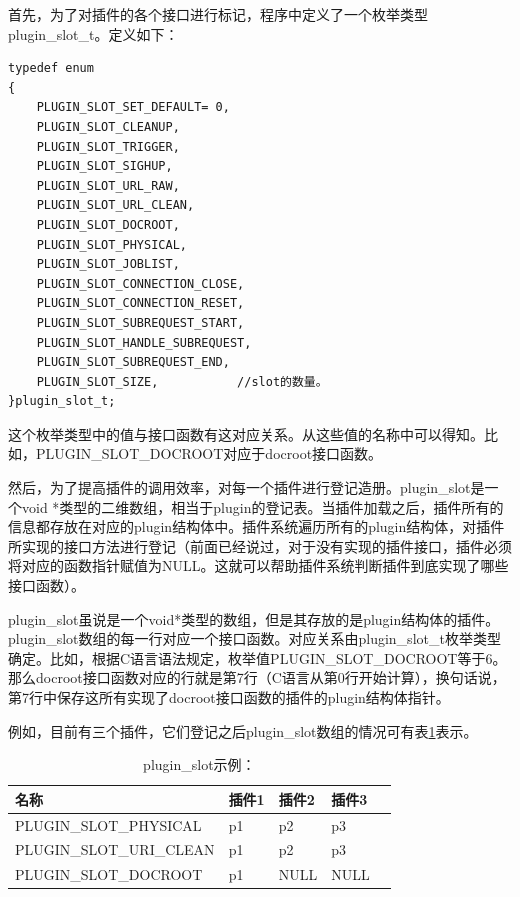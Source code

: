 \documentclass[12pt, twoside, a4paper, xetex]{report}
\begin{document}
	首先，为了对插件的各个接口进行标记，程序中定义了一个枚举类型plugin\_slot\_t。定义如下：
\begin{verbatim}
typedef enum
{
	PLUGIN_SLOT_SET_DEFAULT= 0,
	PLUGIN_SLOT_CLEANUP,
	PLUGIN_SLOT_TRIGGER,
	PLUGIN_SLOT_SIGHUP,
	PLUGIN_SLOT_URL_RAW,
	PLUGIN_SLOT_URL_CLEAN,
	PLUGIN_SLOT_DOCROOT,
	PLUGIN_SLOT_PHYSICAL,
	PLUGIN_SLOT_JOBLIST,
	PLUGIN_SLOT_CONNECTION_CLOSE,
	PLUGIN_SLOT_CONNECTION_RESET,
	PLUGIN_SLOT_SUBREQUEST_START,
	PLUGIN_SLOT_HANDLE_SUBREQUEST,
	PLUGIN_SLOT_SUBREQUEST_END,
	PLUGIN_SLOT_SIZE, 			//slot的数量。
}plugin_slot_t;
\end{verbatim}

	这个枚举类型中的值与接口函数有这对应关系。从这些值的名称中可以得知。比如，PLUGIN\_SLOT\_DOCROOT对应于docroot接口函数。
	
	然后，为了提高插件的调用效率，对每一个插件进行登记造册。plugin\_slot是一个void *类型的二维数组，相当于plugin的登记表。当插件加载之后，插件所有的信息都存放在对应的plugin结构体中。插件系统遍历所有的plugin结构体，对插件所实现的接口方法进行登记（前面已经说过，对于没有实现的插件接口，插件必须将对应的函数指针赋值为NULL。这就可以帮助插件系统判断插件到底实现了哪些接口函数）。
	
	plugin\_slot虽说是一个void*类型的数组，但是其存放的是plugin结构体的插件。plugin\_slot数组的每一行对应一个接口函数。对应关系由plugin\_slot\_t枚举类型确定。比如，根据C语言语法规定，枚举值PLUGIN\_SLOT\_DOCROOT等于6。那么docroot接口函数对应的行就是第7行（C语言从第0行开始计算），换句话说，第7行中保存这所有实现了docroot接口函数的插件的plugin结构体指针。
	
	例如，目前有三个插件，它们登记之后plugin\_slot数组的情况可有表\ref{example_plugin}表示。
	\begin{table}[htbp]
	\caption{plugin\_slot示例：}
	\label{example_plugin}
	\centering
	\begin{tabularx}{\textwidth}{p{6cm}XXXl} %
	\toprule
	\centering 名称 & \centering  插件1 & \centering  插件2 &\centering 插件3&\\
	\midrule
	\centering PLUGIN\_SLOT\_PHYSICAL &\centering  p1 &\centering  p2 &\centering  p3&\\
	\centering PLUGIN\_SLOT\_URI\_CLEAN &\centering  p1 &\centering  p2 &\centering  p3&\\
	\centering PLUGIN\_SLOT\_DOCROOT &\centering  p1 & \centering NULL & \centering NULL&\\
	\bottomrule
	\end{tabularx}
	\end{table}
	
\end{document}
